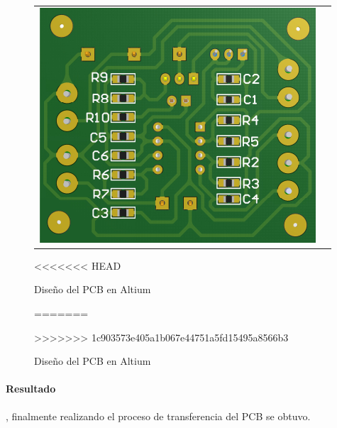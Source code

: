 \begin{figure}[H]
\begin{tabular}{c c}
		\includegraphics[scale=0.6]{Recursos/Altium/Placa_3D_PCB.png} 
	\end{tabular}
<<<<<<< HEAD
	\caption{Dise\~no del PCB en Altium}
=======
	\caption{Diseño del PCB en Altium}
>>>>>>> 1c903573e405a1b067e44751a5fd15495a8566b3
	\label{fig:altium_pcb}
\end{figure}

\paragraph*{Resultado}, finalmente realizando el proceso de transferencia del PCB se obtuvo.

